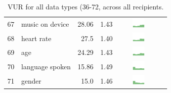 \begin{table}[t]
\begin{center}
\begin{tabular}{| r | l | r | r | r | r |}
67 & music on device & 28.06 & 1.43 & \includegraphics[width = 2cm, height = 0.5cm]{tex-inputs/table-images/copiedanduploadedmusicfromyourdevicecombined} \\ 
68 & heart rate & 27.5 & 1.40 & \includegraphics[width = 2cm, height = 0.5cm]{tex-inputs/table-images/learnedyourheartratecombined} \\ 
69 & age & 24.29 & 1.43 &  \includegraphics[width = 2cm, height = 0.5cm]{tex-inputs/table-images/learnedyouragecombined} \\ 
70 & language spoken & 15.86 & 1.49 & \includegraphics[width = 2cm, height = 0.5cm]{tex-inputs/table-images/learnedthelanguageyouwerespeakingcombined} \\ 
71 & gender & 15.0 & 1.46 &  \includegraphics[width = 2cm, height = 0.5cm]{tex-inputs/table-images/learnedyourgendercombined} \\ 
\hline
\end{tabular}
\caption{VUR for all data types (36-72, across all recipients.}
\end{center}
\end{table}
